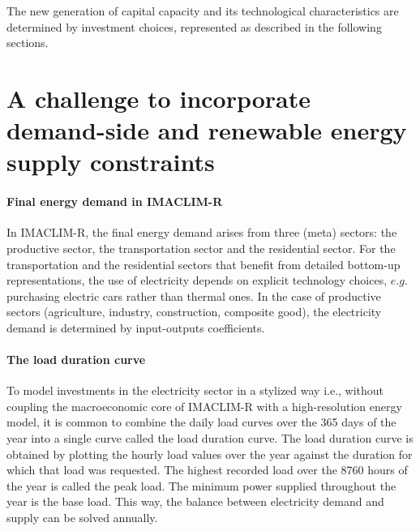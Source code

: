 {The new generation of capital capacity and its technological characteristics are determined by investment choices, represented as described in the following sections.


\section{A challenge to incorporate demand-side and renewable energy supply constraints}

 \paragraph{Final energy demand in IMACLIM-R} 
 In IMACLIM-R, the final energy demand arises from three (meta) sectors: the productive sector, the transportation sector and the residential sector. For the transportation and the residential sectors that benefit from detailed bottom-up representations, the use of electricity depends on explicit technology choices, $e.g.$ purchasing electric cars rather than thermal ones. In the case of productive sectors (agriculture, industry, construction, composite good), the electricity demand is determined by input-outputs coefficients.

 \paragraph{The load duration curve} 

To model investments in the electricity sector in a stylized way i.e., without coupling the macroeconomic core of IMACLIM-R with a high-resolution energy model, it is common to combine the daily load curves over the 365 days of the year into a single curve called the load duration curve. 
The load duration curve is obtained by plotting the hourly load values over the year against the duration for which that load was requested. The highest recorded load over the 8760 hours of the year is called the peak load. The minimum power supplied throughout the year is the base load. This way, the balance between electricity demand and supply can be solved annually.


}
